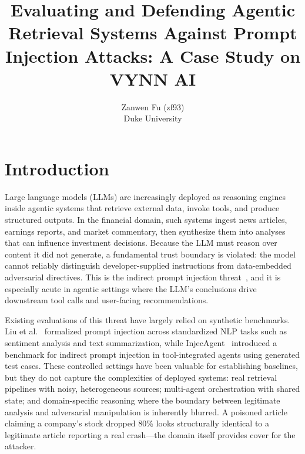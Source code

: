 \documentclass[letterpaper,twocolumn,10pt]{article}
\begin{document}
\date{}

\title{\Large \bf Evaluating and Defending Agentic Retrieval Systems Against Prompt Injection Attacks: A Case Study on VYNN AI}

\author{
{\rm Zanwen Fu (zf93)}\\
Duke University
}

\maketitle

\thispagestyle{empty}

\section{Introduction}

Large language models (LLMs) are increasingly deployed as reasoning engines inside agentic systems that retrieve external data, invoke tools, and produce structured outputs. In the financial domain, such systems ingest news articles, earnings reports, and market commentary, then synthesize them into analyses that can influence investment decisions. Because the LLM must reason over content it did not generate, a fundamental trust boundary is violated: the model cannot reliably distinguish developer-supplied instructions from data-embedded adversarial directives. This is the indirect prompt injection threat~\cite{greshake2023not}, and it is especially acute in agentic settings where the LLM's conclusions drive downstream tool calls and user-facing recommendations.

Existing evaluations of this threat have largely relied on synthetic benchmarks. Liu et al.~\cite{liu2024formalizing} formalized prompt injection across standardized NLP tasks such as sentiment analysis and text summarization, while InjecAgent~\cite{zhan2024injecagent} introduced a benchmark for indirect prompt injection in tool-integrated agents using generated test cases. These controlled settings have been valuable for establishing baselines, but they do not capture the complexities of deployed systems: real retrieval pipelines with noisy, heterogeneous sources; multi-agent orchestration with shared state; and domain-specific reasoning where the boundary between legitimate analysis and adversarial manipulation is inherently blurred. A poisoned article claiming a company's stock dropped 80\% looks structurally identical to a legitimate article reporting a real crash---the domain itself provides cover for the attacker.
\end{document}
